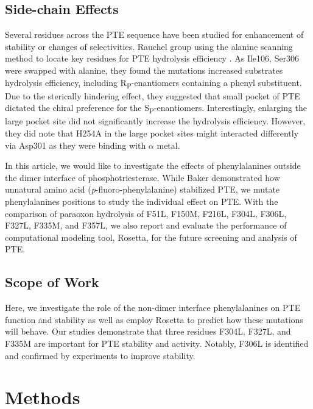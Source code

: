 \begin{refsection}
\subsection{Side-chain Effects}
\label{sec:side-chain}

Several residues across the PTE sequence have been studied for enhancement of
stability \cite{Baker2011b,Yang2014a} or changes of
selectivities\cite{Bigley2013b,Chen-Goodspeed2001a,Pavelka2009}. Rauchel group
using the alanine scanning method to locate key residues for PTE hydrolysis
efficiency \cite{Chen-Goodspeed2001a}. As Ile106, Ser306 were swapped with
alanine, they found the mutations increased substrates hydrolysis
efficiency, including R\textsubscript{P}-enantiomers containing a phenyl
substituent. Due to the sterically hindering effect, they suggested that small
pocket of PTE dictated the chiral preference for the
S\textsubscript{P}-enantiomers. Interestingly, enlarging the large pocket site
did not significantly increase the hydrolysis efficiency. However, they did
note that H254A in the large pocket sites might interacted differently via
Asp301 as they were binding with $\alpha$ metal. 

In this article, we would like to investigate the effects of phenylalanines
outside the dimer interface of phosphotriesterase. While Baker 
demonstrated how unnatural amino acid (\emph{p}-fluoro-phenylalanine)
stabilized PTE, we mutate phenylalanines positions to study the individual
effect on PTE. With the comparison of paraoxon hydrolysis of F51L, F150M,
F216L, F304L, F306L, F327L, F335M, and F357L, we also report and evaluate the
performance of computational modeling tool, Rosetta, for the future screening
and analysis of PTE.

\subsection{Scope of Work}

Here, we investigate the role of the non-dimer interface phenylalanines on PTE
function and stability as well as employ Rosetta to predict how these mutations
will behave. Our studies demonstrate that three residues F304L, F327L, and
F335M are important for PTE stability and activity. Notably, F306L is
identified and confirmed by experiments to improve stability.

\section{Methods}


\end{refsection}
